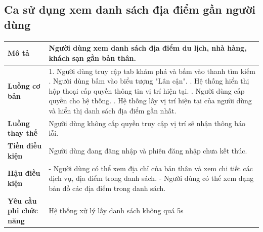 \subsection{Ca sử dụng xem danh sách địa điểm gần người dùng}
\vspace{0.5cm}


\noindent 
\begin{tabularx}{\linewidth}{| l | X |} 
\hline 
\textbf{Mô tả} & Người dùng xem danh sách địa điểm du lịch, nhà hàng, khách sạn gần bản thân.  \\ 
\hline 
\textbf{Luồng cơ bản} & 1. Người dùng truy cập tab khám phá và bấm vào thanh tìm kiếm  \newline
                        2. Người dùng bấm vào biểu tượng "Lân cận". \newline
                        3. Hệ thống hiển thị hộp thoại cấp quyền thông tin
                        vị trí hiện tại. \newline
                        4. Người dùng cấp quyền cho hệ thống. \newline
                        5. Hệ thống lấy vị trí hiện tại của người dùng và hiển thị danh sách địa điểm gần nhất. \\
                     
\hline 
\textbf{Luồng thay thế} & Người dùng không cấp quyền truy cập vị trí sẽ nhận thông báo lỗi.\\           
\hline 
\textbf{Tiền điều kiện} & Người dùng đang đăng nhập và phiên đăng nhập chưa kết thúc. \\
\hline 
\textbf{Hậu điều kiện} &- Người dùng có thể xem địa chỉ của bản thân và xem chi tiết các dịch vụ, địa điểm trong danh sách. \newline
                        - Người dùng có thể xem dạng bản đồ các địa điểm trong danh sách. \\

\hline 
\textbf{Yêu cầu phi chức năng} & Hệ thống xử lý lấy danh sách không quá 5s  \\ 
\hline 
\end{tabularx}

\vspace{0.8cm}

